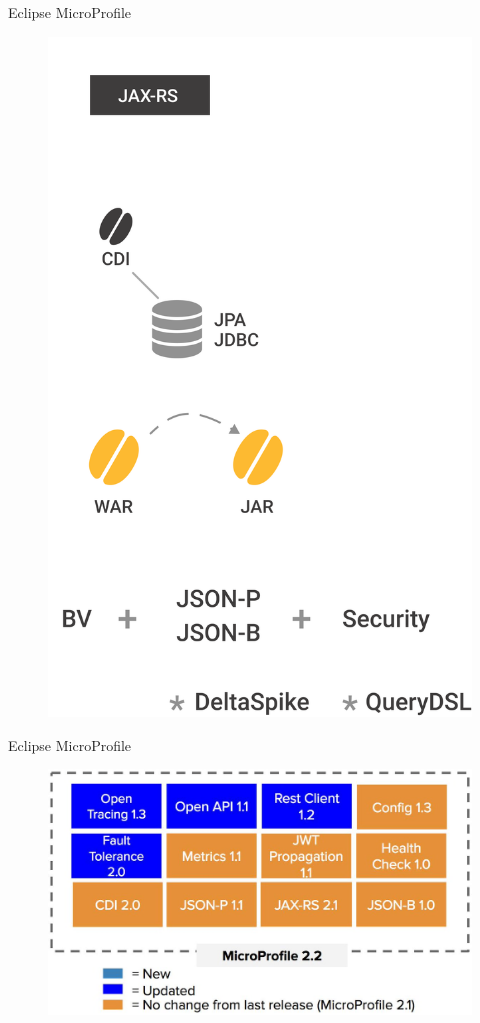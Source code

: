 \documentclass[aspectratio=169]{beamer}
\begin{document}
\begin{frame}{Eclipse MicroProfile}
\begin{figure}
	\centering
	\includegraphics[width=0.35\linewidth]{Images/newsetup}
\end{figure}
\end{frame}

\begin{frame}{Eclipse MicroProfile}
\begin{figure}
	\centering
	\includegraphics[width=\linewidth]{Images/microprofile}
\end{figure}
\end{frame}

\end{document}
